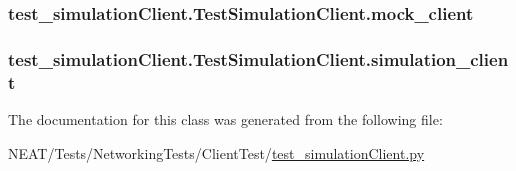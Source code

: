 \subsubsection[{\texorpdfstring{mock\+\_\+client}{mock_client}}]{\setlength{\rightskip}{0pt plus 5cm}test\+\_\+simulation\+Client.\+Test\+Simulation\+Client.\+mock\+\_\+client}\hypertarget{classtest__simulationClient_1_1TestSimulationClient_ab43a0194f71d5fce0a05ec93c55dafac}{}\label{classtest__simulationClient_1_1TestSimulationClient_ab43a0194f71d5fce0a05ec93c55dafac}
\subsubsection[{\texorpdfstring{simulation\+\_\+client}{simulation_client}}]{\setlength{\rightskip}{0pt plus 5cm}test\+\_\+simulation\+Client.\+Test\+Simulation\+Client.\+simulation\+\_\+client}\hypertarget{classtest__simulationClient_1_1TestSimulationClient_a315ce6090533b4f67fc8a500cb76a920}{}\label{classtest__simulationClient_1_1TestSimulationClient_a315ce6090533b4f67fc8a500cb76a920}


The documentation for this class was generated from the following file\+:\begin{DoxyCompactItemize}
\item 
N\+E\+A\+T/\+Tests/\+Networking\+Tests/\+Client\+Test/\hyperlink{test__simulationClient_8py}{test\+\_\+simulation\+Client.\+py}\end{DoxyCompactItemize}
